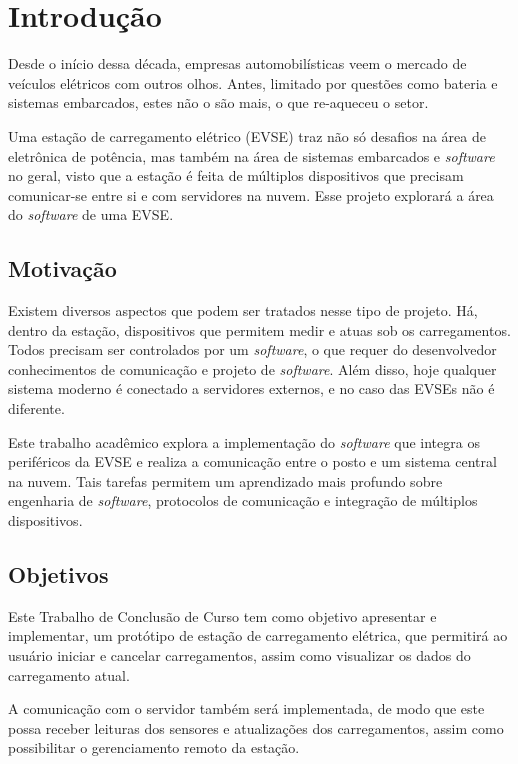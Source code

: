 \chapter{Introdução}

Desde o início dessa década, empresas automobilísticas veem o mercado de veículos elétricos com outros olhos. Antes, limitado por questões como bateria e sistemas embarcados, estes não o são mais, o que re-aqueceu o setor.

Uma estação de carregamento elétrico (EVSE) traz não só desafios na área de eletrônica de potência, mas também na área de sistemas embarcados e \textit{software} no geral, visto que a estação é feita de múltiplos dispositivos que precisam comunicar-se entre si e com servidores na nuvem. Esse projeto explorará a área do \textit{software} de uma EVSE.

\section{Motivação}

Existem diversos aspectos que podem ser tratados nesse tipo de projeto. Há, dentro da estação, dispositivos que permitem medir e atuas sob os carregamentos. Todos precisam ser controlados por um \textit{software}, o que requer do desenvolvedor conhecimentos de comunicação e projeto de \textit{software}. Além disso, hoje qualquer sistema moderno é conectado a servidores externos, e no caso das EVSEs não é diferente.

Este trabalho acadêmico explora a implementação do \textit{software} que integra os periféricos da EVSE e realiza a comunicação entre o posto e um sistema central na nuvem. Tais tarefas permitem um aprendizado mais profundo sobre engenharia de \textit{software}, protocolos de comunicação e integração de múltiplos dispositivos.

\section{Objetivos}

Este Trabalho de Conclusão de Curso tem como objetivo apresentar e implementar, um protótipo de estação de carregamento elétrica, que permitirá ao usuário iniciar e cancelar carregamentos, assim como visualizar os dados do carregamento atual.

A comunicação com o servidor também será implementada, de modo que este possa receber leituras dos sensores e atualizações dos carregamentos, assim como possibilitar o gerenciamento remoto da estação.

